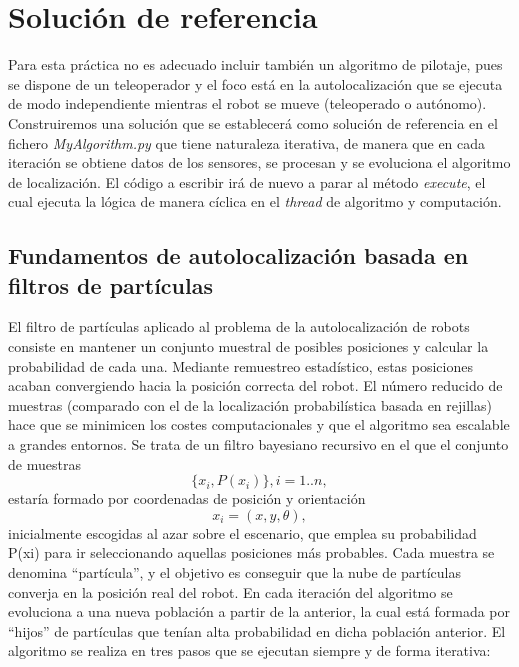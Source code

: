 \section{Solución de referencia}
Para esta práctica no es adecuado incluir también un algoritmo de pilotaje, pues se dispone de un teleoperador y el foco está en la autolocalización que se ejecuta de modo independiente mientras el robot se mueve (teleoperado o autónomo). Construiremos una solución que se establecerá como solución de referencia en el fichero \textit{MyAlgorithm.py} que tiene naturaleza iterativa, de manera que en cada iteración se obtiene datos de los sensores, se procesan y se evoluciona el algoritmo de localización. El código a escribir irá de nuevo a parar al método \textit{execute}, el cual ejecuta la lógica de manera cíclica en el \textit{thread} de algoritmo y computación.

\subsection{Fundamentos de autolocalización basada en filtros de partículas}
El filtro de partículas aplicado al problema de la autolocalización de robots consiste en mantener un conjunto muestral de posibles posiciones y calcular la probabilidad de cada una. Mediante remuestreo estadístico, estas posiciones acaban convergiendo hacia la posición correcta del robot. El número reducido de muestras (comparado con el de la localización probabilística basada en rejillas) hace que se minimicen los costes computacionales y que el algoritmo sea escalable a grandes entornos. Se trata de un filtro bayesiano recursivo en el que el conjunto de muestras
\begin{equation}
\{x_{i},P(x_{i})\}, i = 1..n,
\end{equation} estaría formado por coordenadas de posición y orientación
\begin{equation}
x_{i} = (x, y, \theta),
\end{equation} inicialmente escogidas al azar sobre el escenario, que emplea su probabilidad P(xi) para ir seleccionando aquellas posiciones más probables. Cada muestra se denomina “partícula”, y el objetivo es conseguir que la nube de partículas converja en la posición real del robot. En cada iteración del algoritmo se evoluciona a una nueva población a partir de la anterior, la cual está formada por “hijos” de partículas que tenían alta probabilidad en dicha población anterior. El algoritmo se realiza en tres pasos que se ejecutan siempre y de forma iterativa:

